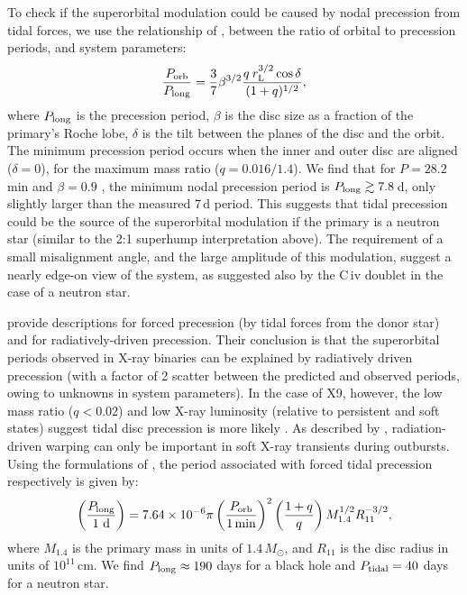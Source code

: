 \documentclass[a4paper,fleqn,usenatbib]{mnras}
\begin{document}
To check if the superorbital modulation could be caused by nodal precession from tidal forces, we use the relationship of \citet[Equation~5]{1998MNRAS.299L..32L}, between the ratio of orbital to precession periods, and system parameters:
\begin{equation}
\frac{P_{\rm orb}}{P_{\rm long}} = \frac{3}{7} \beta^{3/2} \frac{q \: r_{\rm L}^{3/2} \cos \delta}{(1+q)^{1/2}},
\end{equation}
where $P_{\rm long}$ is the precession period, $\beta$ is the disc size as a fraction of the primary's Roche lobe, $\delta$ is the tilt between the planes of the disc and the orbit. The minimum precession period occurs when the inner and outer disc are aligned ($\delta = 0$), for the maximum mass ratio ($q = 0.016/1.4$). We find that for $P = 28.2$\,min and $\beta = 0.9$ \citep{2012A&A...537A.104V}, the minimum nodal precession period is $P_{\rm long} \gtrsim 7.8$\,d, only slightly larger than the measured 7\,d period. This suggests that tidal precession could be the source of the superorbital modulation if the primary is a neutron star (similar to the 2:1 superhump interpretation above). The requirement of a small misalignment angle, and the large amplitude of this modulation, suggest a nearly edge-on view of the system, as suggested also by the C\,{\sc iv} doublet in the case of a neutron star.

\citet{1999MNRAS.308..207W} provide descriptions for forced precession (by tidal forces from the donor star) and for radiatively-driven precession. Their conclusion is that the superorbital periods observed in X-ray binaries can be explained by radiatively driven precession (with a factor of 2 scatter between the predicted and observed periods, owing to unknowns in system parameters). In the case of X9, however, the low mass ratio ($q < 0.02$) and low X-ray luminosity (relative to persistent and soft states) suggest tidal disc precession is more likely \citep{2001MNRAS.320..485O, 2012MNRAS.420.1575K}. As described by \citet{2001MNRAS.320..485O}, radiation-driven warping can only be important in soft X-ray transients during outbursts. Using the formulations of \citet{1999MNRAS.308..207W}, the period associated with forced tidal precession respectively is given by:
\begin{equation}
\left( \frac{P_{\rm long}}{1\rm~d} \right) = 7.64\times 10^{-6} \pi \left(\frac{P_{\rm orb}}{1 {\rm\,min}}\right)^2 \left(\frac{1+q}{q}\right) M_{1.4}^{1/2} R_{11}^{-3/2},
\end{equation}
where $M_{1.4}$ is the primary mass in units of $1.4\,M_\odot$, and $R_{11}$ is the disc radius in units of $10^{11}$\,cm. We find $P_{\rm long} \approx 190$ days for a black hole and $P_{\rm tidal} = 40$ days for a neutron star.
\end{document}
